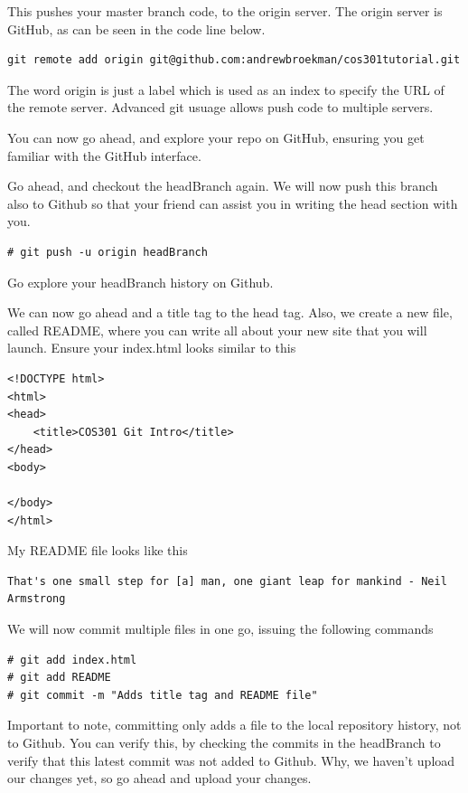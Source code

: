 \documentclass[a4paper,10pt]{article}
\begin{document}
This pushes your master branch code, to the origin server. The origin server is GitHub, as can be seen in the code line below.

\begin{lstlisting}[style=OutputStyle]
git remote add origin git@github.com:andrewbroekman/cos301tutorial.git
\end{lstlisting}

The word origin is just a label which is used as an index to specify the URL of the remote server. Advanced git usuage allows push code to multiple servers. 

You can now go ahead, and explore your repo on GitHub, ensuring you get familiar with the GitHub interface.

Go ahead, and checkout the headBranch again. We will now push this branch also to Github so that your friend can assist you in writing the head section with you. 
\begin{lstlisting}[style=TerminalStyle]
# git push -u origin headBranch
\end{lstlisting}

Go explore your headBranch history on Github.

We can now go ahead and a title tag to the head tag. Also, we create a new file, called README, where you can write all about your new site that you will launch. Ensure your index.html looks similar to this

\begin{lstlisting}[style=HtmlStyle]
<!DOCTYPE html>
<html>
<head>
	<title>COS301 Git Intro</title>
</head>
<body>

</body>
</html>
\end{lstlisting}

My README file looks like this

\begin{lstlisting}[style=TerminalStyle]
That's one small step for [a] man, one giant leap for mankind - Neil Armstrong
\end{lstlisting}

We will now commit multiple files in one go, issuing the following commands

\begin{lstlisting}[style=TerminalStyle]
# git add index.html
# git add README
# git commit -m "Adds title tag and README file"
\end{lstlisting}

Important to note, committing only adds a file to the local repository history, not to Github. You can verify this, by checking the commits in the headBranch to verify that this latest commit was not added to Github. Why, we haven't upload our changes yet, so go ahead and upload your changes.
\end{document}
